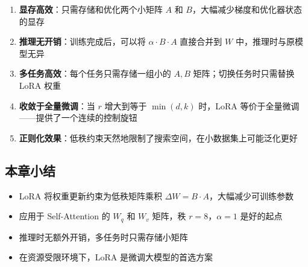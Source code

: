 \begin{enumerate}
    \item \textbf{显存高效}：只需存储和优化两个小矩阵 $A$ 和 $B$，大幅减少梯度和优化器状态的显存
    \item \textbf{推理无开销}：训练完成后，可以将 $\alpha \cdot B \cdot A$ 直接合并到 $W$ 中，推理时与原模型无异
    \item \textbf{多任务高效}：每个任务只需存储一组小的 $A, B$ 矩阵；切换任务时只需替换 LoRA 权重
    \item \textbf{收敛于全量微调}：当 $r$ 增大到等于 $\min(d, k)$ 时，LoRA 等价于全量微调——提供了一个连续的控制旋钮
    \item \textbf{正则化效果}：低秩约束天然地限制了搜索空间，在小数据集上可能泛化更好
\end{enumerate}

\subsection{本章小结}

\begin{itemize}
    \item LoRA 将权重更新约束为低秩矩阵乘积 $\Delta W = B \cdot A$，大幅减少可训练参数
    \item 应用于 Self-Attention 的 $W_q$ 和 $W_v$ 矩阵，秩 $r = 8$，$\alpha = 1$ 是好的起点
    \item 推理时无额外开销，多任务时只需存储小矩阵
    \item 在资源受限环境下，LoRA 是微调大模型的首选方案
\end{itemize}


